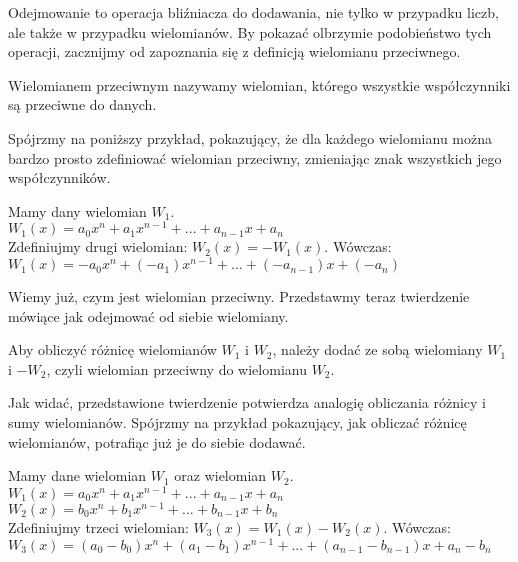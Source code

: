 Odejmowanie to operacja bliźniacza do dodawania, nie tylko w przypadku liczb, ale także w przypadku wielomianów. By pokazać olbrzymie podobieństwo tych operacji, zacznijmy od zapoznania się z definicją wielomianu przeciwnego.

\begin{definition}
	$ $\\
	Wielomianem przeciwnym nazywamy wielomian, którego wszystkie współczynniki są przeciwne do danych.
\end{definition}

Spójrzmy na poniższy przykład, pokazujący, że dla każdego wielomianu można bardzo prosto zdefiniować wielomian przeciwny, zmieniając znak wszystkich jego współczynników.

\begin{example}
	$ $\\
	Mamy dany wielomian $W_1$. \\
	$W_1(x) = a_0x^n + a_1x^{n-1} + ... + a_{n-1}x + a_n$ \\
	Zdefiniujmy drugi wielomian: $W_2(x) = -W_1(x)$. Wówczas: \\
	$W_1(x) = -a_0x^n + (-a_1)x^{n-1} + ... + (-a_{n-1})x + (-a_n)$
\end{example}

Wiemy już, czym jest wielomian przeciwny. Przedstawmy teraz twierdzenie mówiące jak odejmować od siebie wielomiany.

\begin{theorem}
	$ $\\
	Aby obliczyć różnicę wielomianów $W_1$ i $W_2$, należy dodać ze sobą wielomiany $W_1$ i $-W_2$, czyli wielomian przeciwny do wielomianu $W_2$.
\end{theorem}

Jak widać, przedstawione twierdzenie potwierdza analogię obliczania różnicy i sumy wielomianów. Spójrzmy na przykład pokazujący, jak obliczać różnicę wielomianów, potrafiąc już je do siebie dodawać.

\begin{example}
	$ $\\
	Mamy dane wielomian $W_1$ oraz wielomian $W_2$.
	$W_1(x) = a_0x^n + a_1x^{n-1} + ... + a_{n-1}x + a_n$ \\
	$W_2(x) = b_0x^n + b_1x^{n-1} + ... + b_{n-1}x + b_n$ \\
	Zdefiniujmy trzeci wielomian: $W_3(x) = W_1(x) - W_2(x)$. Wówczas: \\
	$W_3(x) = (a_0-b_0)x^n + (a_1-b_1)x^{n-1} + ... + (a_{n-1} - b_{n-1})x + a_n - b_n$
\end{example}

